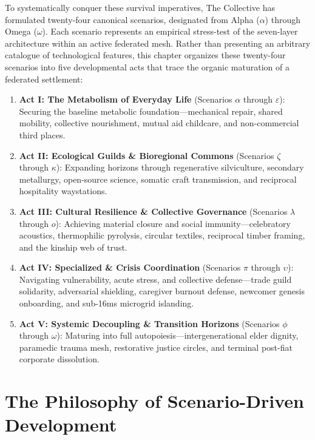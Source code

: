 To systematically conquer these survival imperatives, The Collective has formulated twenty-four canonical scenarios, designated from Alpha ($\alpha$) through Omega ($\omega$). Each scenario represents an empirical stress-test of the seven-layer architecture within an active federated mesh. Rather than presenting an arbitrary catalogue of technological features, this chapter organizes these twenty-four scenarios into five developmental acts that trace the organic maturation of a federated settlement:
\begin{enumerate}
    \item \textbf{Act I: The Metabolism of Everyday Life} (Scenarios $\alpha$ through $\varepsilon$): Securing the baseline metabolic foundation---mechanical repair, shared mobility, collective nourishment, mutual aid childcare, and non-commercial third places.
    \item \textbf{Act II: Ecological Guilds \& Bioregional Commons} (Scenarios $\zeta$ through $\kappa$): Expanding horizons through regenerative silviculture, secondary metallurgy, open-source science, somatic craft transmission, and reciprocal hospitality waystations.
    \item \textbf{Act III: Cultural Resilience \& Collective Governance} (Scenarios $\lambda$ through $o$): Achieving material closure and social immunity---celebratory acoustics, thermophilic pyrolysis, circular textiles, reciprocal timber framing, and the kinship web of trust.
    \item \textbf{Act IV: Specialized \& Crisis Coordination} (Scenarios $\pi$ through $\upsilon$): Navigating vulnerability, acute stress, and collective defense---trade guild solidarity, adversarial shielding, caregiver burnout defense, newcomer genesis onboarding, and sub-16ms microgrid islanding.
    \item \textbf{Act V: Systemic Decoupling \& Transition Horizons} (Scenarios $\phi$ through $\omega$): Maturing into full autopoiesis---intergenerational elder dignity, paramedic trauma mesh, restorative justice circles, and terminal post-fiat corporate dissolution.
\end{enumerate}

\section{The Philosophy of Scenario-Driven Development}
\label{sec:scdd_philosophy}

